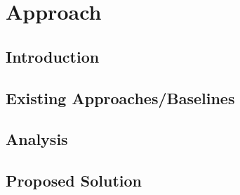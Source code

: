 
\chapter{Approach}
\label{ch:approach}

\section{Introduction}
 
\section{Existing Approaches/Baselines}

\section{Analysis}

\section{Proposed Solution}

